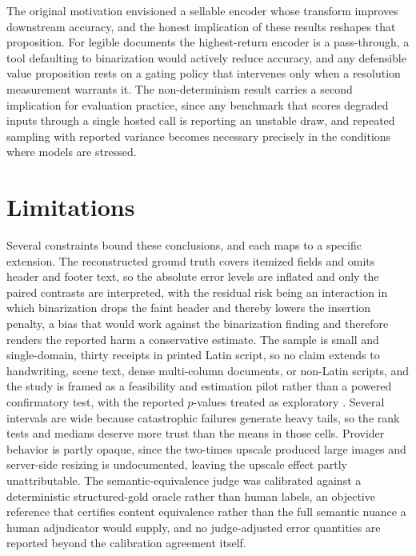 \documentclass[11pt]{article}
\begin{document}
The original motivation envisioned a sellable encoder whose transform improves downstream accuracy,
and the honest implication of these results reshapes that proposition. For legible documents the
highest-return encoder is a pass-through, a tool defaulting to binarization would actively reduce
accuracy, and any defensible value proposition rests on a gating policy that intervenes only when a
resolution measurement warrants it. The non-determinism result carries a second implication for
evaluation practice, since any benchmark that scores degraded inputs through a single hosted call is
reporting an unstable draw, and repeated sampling with reported variance becomes necessary precisely
in the conditions where models are stressed.

\section{Limitations}
\label{sec:limitations}

Several constraints bound these conclusions, and each maps to a specific extension. The reconstructed
ground truth covers itemized fields and omits header and footer text, so the absolute error levels
are inflated and only the paired contrasts are interpreted, with the residual risk being an
interaction in which binarization drops the faint header and thereby lowers the insertion penalty, a
bias that would work against the binarization finding and therefore renders the reported harm a
conservative estimate. The sample is small and single-domain, thirty receipts in printed Latin
script, so no claim extends to handwriting, scene text, dense multi-column documents, or non-Latin
scripts, and the study is framed as a feasibility and estimation pilot rather than a powered
confirmatory test, with the reported $p$-values treated as exploratory \citep{leon2011pilot}.
Several intervals are wide because catastrophic failures generate heavy tails, so the rank tests and
medians deserve more trust than the means in those cells. Provider behavior is partly opaque, since
the two-times upscale produced large images and server-side resizing is undocumented, leaving the
upscale effect partly unattributable. The semantic-equivalence judge was calibrated against a
deterministic structured-gold oracle rather than human labels, an objective reference that certifies
content equivalence rather than the full semantic nuance a human adjudicator would supply, and no
judge-adjusted error quantities are reported beyond the calibration agreement itself.
\end{document}
